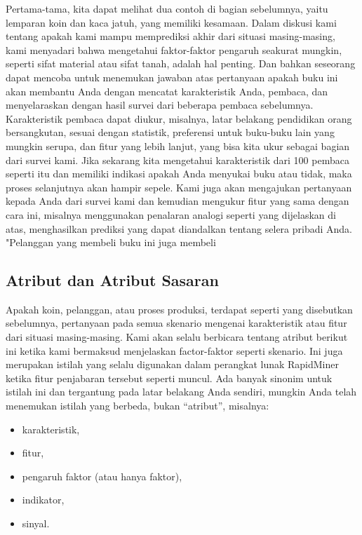\par Pertama-tama, kita dapat melihat dua contoh di bagian sebelumnya, yaitu lemparan koin dan kaca jatuh, yang memiliki kesamaan. Dalam diskusi kami tentang apakah kami mampu memprediksi akhir dari situasi masing-masing, kami menyadari bahwa mengetahui faktor-faktor pengaruh seakurat mungkin, seperti sifat material atau sifat tanah, adalah hal penting. Dan bahkan seseorang dapat mencoba untuk menemukan jawaban atas pertanyaan apakah buku ini akan membantu Anda dengan mencatat karakteristik Anda, pembaca, dan menyelaraskan dengan hasil survei dari beberapa pembaca sebelumnya. Karakteristik pembaca dapat diukur, misalnya, latar belakang pendidikan orang bersangkutan, sesuai dengan statistik, preferensi untuk buku-buku lain yang mungkin serupa, dan fitur yang lebih lanjut, yang bisa kita ukur sebagai bagian dari survei kami. Jika sekarang kita mengetahui karakteristik dari 100 pembaca seperti itu dan memiliki indikasi apakah Anda menyukai buku atau tidak, maka proses selanjutnya akan hampir sepele. Kami juga akan mengajukan pertanyaan kepada Anda dari survei kami dan kemudian mengukur fitur yang sama dengan cara ini, misalnya menggunakan penalaran analogi seperti yang dijelaskan di atas, menghasilkan prediksi yang dapat diandalkan tentang selera pribadi Anda. "Pelanggan yang membeli buku ini juga membeli 

\subsection{Atribut dan Atribut Sasaran }
\par Apakah koin, pelanggan, atau proses produksi, terdapat seperti yang disebutkan sebelumnya, pertanyaan pada semua skenario mengenai karakteristik atau fitur dari situasi masing-masing. Kami akan selalu berbicara tentang atribut berikut ini ketika kami bermaksud menjelaskan factor-faktor seperti skenario. Ini juga merupakan istilah yang selalu digunakan dalam perangkat lunak RapidMiner ketika fitur penjabaran tersebut seperti muncul. Ada banyak sinonim untuk istilah ini dan tergantung pada latar belakang Anda sendiri, mungkin Anda telah menemukan istilah yang berbeda, bukan “atribut”, misalnya:

\begin{itemize}
    \item karakteristik,
 \item	fitur, 
 \item	pengaruh faktor (atau hanya faktor), 
 \item	indikator, 
 \item	sinyal.

\end{itemize}

